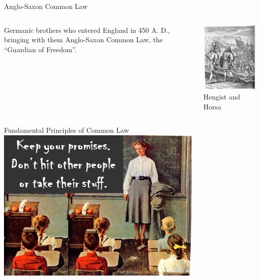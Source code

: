 \begin{frame}{Anglo-Saxon Common Law}
    \begin{columns}[onlytextwidth]
            Germanic brothers who entered England in 450 A. D., bringing with them Anglo-Saxon Common Law, the ``Guardian of Freedom''.

            \centering
            \includegraphics[height=0.55\textheight]{img/hengist-horsa.png} \\
            Hengist and Horsa \\
    \end{columns}
\end{frame}

\begin{frame}{Fundamental Principles of Common Law}
    \centering
    \includegraphics[width=0.75\textwidth]{img/schoolroom.png} \\
\end{frame}


